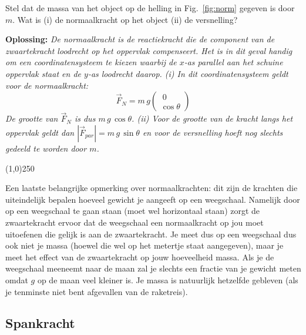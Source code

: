 \begin{voorbeeld} 
\label{ex:normaalkracht}
Stel dat de massa van het object op de helling in Fig.~\ref{fig:norm} gegeven is door $m$. 
Wat is (i) de normaalkracht op het object (ii) de versnelling? 

{\bf Oplossing: } {\it De normaalkracht is de reactiekracht die de component van de zwaartekracht 
loodrecht op het oppervlak compenseert. Het is in dit geval handig om een coordinatensysteem te 
kiezen waarbij de $x$-as parallel aan het schuine oppervlak staat en de $y$-as loodrecht daarop. 
(i) In dit coordinatensysteem geldt voor de normaalkracht:
\begin{equation}
\vec{F}_N = m \, g \left(\begin{array}{c}\
0 \\
\cos\theta
\end{array}\right)
\end{equation} 
De grootte van $\vec{F}_N$ is dus $m\,g\,\cos\theta$. (ii) Voor de grootte van de kracht langs het
oppervlak geldt dan $|\vec{F}_{par}|=m\,g\,\sin\theta$ en voor de versnelling hoeft nog slechts
gedeeld te worden door $m$.
 }
\end{voorbeeld}
\begin{center}
\line(1,0){250}
\end{center}

Een laatste belangrijke opmerking over normaalkrachten: dit zijn de krachten die uiteindelijk
bepalen hoeveel gewicht je aangeeft op een weegschaal. Namelijk door op een weegschaal
te gaan staan (moet wel horizontaal staan) zorgt de zwaartekracht ervoor dat de weegschaal
een normaalkracht op jou moet uitoefenen die gelijk is aan de zwaartekracht. Je meet dus
op een weegschaal dus ook niet je massa (hoewel die wel op het metertje staat aangegeven), 
maar je meet het effect van de zwaartekracht op jouw hoeveelheid massa. Als je de
weegschaal meeneemt naar de maan zal je slechts een fractie van je gewicht meten omdat
$g$ op de maan veel kleiner is. Je massa is natuurlijk hetzelfde gebleven (als je tenminste
niet bent afgevallen van de raketreis). 

\subsection{Spankracht}

